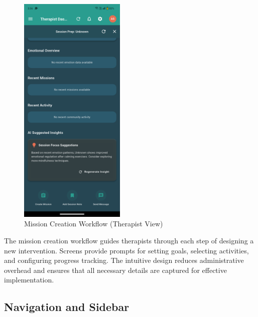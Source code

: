 \documentclass[12pt,a4paper]{article}
\newcommand{\sectiontitle}[1]{\subsection{#1}}
\begin{document}
\begin{figure}[H]
    \centering
    \includegraphics[width=0.45\textwidth]{Screenshots/restofmissioncreationtherapist.png}
    \caption{Mission Creation Workflow (Therapist View)}
    \label{fig:mission-creation-workflow}
\end{figure}
The mission creation workflow guides therapists through each step of designing a new intervention. Screens provide prompts for setting goals, selecting activities, and configuring progress tracking. The intuitive design reduces administrative overhead and ensures that all necessary details are captured for effective implementation.

\sectiontitle{Navigation and Sidebar}
\end{document}
